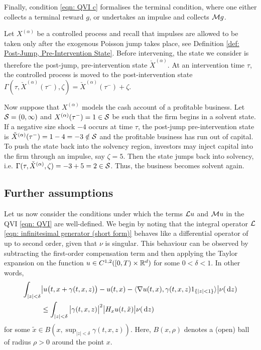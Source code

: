 Finally, condition \eqref{eqn: QVI c} formalises the terminal condition, where one either collects a terminal reward $g$, or undertakes an impulse and collects $\mathcal{M} g$. 

\begin{example}
\label{ex: solvency time notice}
    Let $X^{(\alpha)}$ be a controlled process and recall that impulses are allowed to be taken only after the exogenous Poisson jump takes place, see Definition \ref{def: Post-Jump, Pre-Intervention State}. Before intervening, the state we consider is therefore the post-jump, pre-intervention state $\check{X}^{(\alpha)}$. At an intervention time $\tau$, the controlled process is moved to the post-intervention state $\Gamma(\tau, \check{X}^{(\alpha)}(\tau^-), \zeta) = \check{X}^{(\alpha)}(\tau^-) + \zeta$. 

    Now suppose that $X^{(\alpha)}$ models the cash account of a profitable business. Let $\mathcal{S} = (0,\infty)$ and $X^{(\alpha)}(\tau^-) = 1 \in \mathcal{S}$ be such that the firm begins in a solvent state. If a negative size shock $-4$ occurs at time $\tau$, the post-jump pre-intervention state is $\check{X}^{(\alpha)}(\tau^-) = 1-4 = -3 \notin \mathcal{S}$ and the profitable business has run out of capital. To push the state back into the solvency region, investors may inject capital into the firm through an impulse, say $\zeta=5$. Then the state jumps back into solvency, i.e. $\Gamma(\tau, \check{X}^{(\alpha)},\zeta) = -3 + 5 = 2 \in \mathcal{S}$. Thus, the business becomes solvent again.
\end{example}

\subsection{Further assumptions}
Let us now consider the conditions under which the terms $\mathcal{L} u$ and $\mathcal{M} u$ in the QVI \eqref{eqn: QVI} are well-defined. We begin by noting that the integral operator $\mathcal{L}$ \eqref{eqn: infinitesimal generator (short form)} behaves like a differential operator of up to second order, given that $\nu$ is singular. This behaviour can be observed by subtracting the first-order compensation term and then applying the Taylor expansion on the function $u \in C^{1,2}([0,T) \times \mathbb{R}^d)$ for some $0 < \delta < 1$. In other words,
\begin{align}
    \int_{|z|<\delta} & \big| u\big(t,x+\gamma(t,x,z)\big) -u(t,x) - \langle \nabla u(t,x), \gamma(t,x,z) 1_{\left\{|z|<1\right\}} \rangle \big| \nu(\,\mathrm{d} z) \nonumber \\
    & \leq \int_{|z|<\delta} \big| \gamma(t,x,z) \big|^2 \big| H_xu(t,\tilde x) \big| \nu(\,\mathrm{d} z)
    \label{eqn: (12) in Seydel}
\end{align}
for some $\tilde x \in B(x,\sup_{|z|<\delta} \gamma(t,x,z))$. Here, $B(x,\rho)$ denotes a (open) ball of radius $\rho>0$ around the point $x$. 

